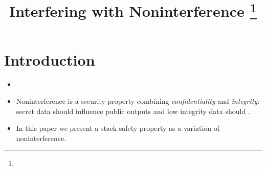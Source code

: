\documentclass[conference]{IEEEtran}
\begin{document}
\title{Interfering with Noninterference
\iftext\thanks{}\fi
}


\maketitle

\iftext
\begin{abstract}
\end{abstract}

\begin{IEEEkeywords}
\end{IEEEkeywords}
\fi

\iftext
\section{Introduction}

\begin{itemize}
\item {}
\item Noninterference is a security property combining {\em
  confidentiality} and {\em integrity}: secret data should influence
  public outputs and low integrity data should .
\item In this paper we present a stack safety property as a variation
  of noninterference.
\end{itemize}
\end{document}
